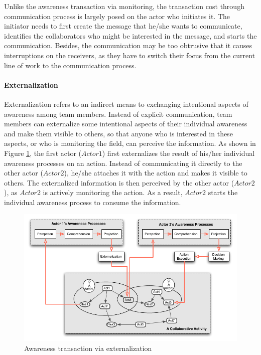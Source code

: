 Unlike the awareness transaction via monitoring, the transaction cost through communication process is largely posed on the actor who initiates it. The initiator needs to first create the message that he/she wants to communicate, identifies the collaborators who might be interested in the message, and starts the communication. Besides, the communication may be too obtrusive that it causes interruptions on the receivers, as they have to switch their focus from the current line of work to the communication process.

\paragraph*{Externalization} %
\label{par:externalization}
Externalization refers to an indirect means to exchanging intentional aspects of awareness among team members. Instead of explicit communication, team members can externalize some intentional aspects of their individual awareness and make them visible to others, so that anyone who is interested in these aspects, or who is monitoring the field, can perceive the information. As shown in Figure \ref{fig:trans_externalization}, the first actor ($Actor1$) first externalizes the result of his/her individual awareness processes on an action. Instead of communicating it directly to the other actor ($Actor2$), he/she attaches it with the action and makes it visible to others. The externalized information is then perceived by the other actor ($Actor2$), as $Actor2$ is actively monitoring the action. As a result, $Actor2$ starts the individual awareness process to consume the information.

\begin{figure}[htbp] %
   \centering
   \includegraphics{trans_externalization.pdf} 
   \caption{Awareness transaction via externalization}
   \label{fig:trans_externalization}
\end{figure}

